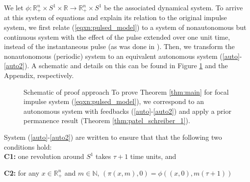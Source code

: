 \documentclass{article}
\theoremstyle{definition}
\newcommand{\R}{{\mathbb{R}}}
\newcommand{\N}{{\mathbb{N}}}
\begin{document}
We let $\phi:\R_+^n \times S^1 \times \R \rightarrow \R_+^n \times S^1$ be the associated dynamical system.  To arrive at this system of equations and explain its relation to the original impulse system, we first relate (\ref{eqxn:pulsed_model}) to a system of nonautonomous but continuous system with the effect of the pulse extended over one unit time, instead of the instantaneous pulse (as was done in \cite{patel_spectral_2024}). Then, we transform the nonautonomous (periodic) system to an equivalent autonomous system (\ref{auto}-\ref{auto2}). A schematic and details on this can be found in Figure \ref{fig:three_dyn_systems_overview} and the Appendix, respectively. 
\begin{figure}
   \begin{center}
    \end{center}
    \caption{Schematic of proof approach  To prove Theorem \ref{thm:main} for focal impulse system (\ref{eqxn:pulsed_model}), we correspond to an autonomous system with feedbacks (\ref{auto}-\ref{auto2}) and apply a prior permanence result (Theorem \ref{thm:patel_schreiber_1}).}
    
    \label{fig:three_dyn_systems_overview}
\end{figure}


System (\ref{auto}-\ref{auto2}) are written to ensure that that the following two conditions hold:
\\

\noindent \textbf{C1:} one revolution around $S^1$ takes $\tau+1$ time units, and

\noindent \textbf{C2:} for any $x\in \R_+^n$ and $m \in \N$, $(\pi(x,m), 0) = \phi((x,0),m(\tau+1))$
\\
\end{document}
